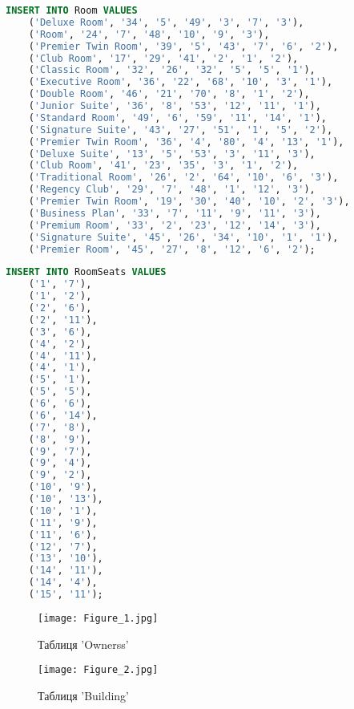\documentclass[a4paper,12pt]{article}
\begin{document}
	
	\begin{lstlisting}[language=SQL]
	INSERT INTO Room VALUES
	('Deluxe Room', '34', '5', '49', '3', '7', '3'),
	('Room', '24', '7', '48', '10', '9', '3'),
	('Premier Twin Room', '39', '5', '43', '7', '6', '2'),
	('Club Room', '17', '29', '41', '2', '1', '2'),
	('Classic Room', '32', '26', '32', '5', '5', '1'),
	('Executive Room', '36', '22', '68', '10', '3', '1'),
	('Double Room', '46', '21', '70', '8', '1', '2'),
	('Junior Suite', '36', '8', '53', '12', '11', '1'),
	('Standard Room', '49', '6', '59', '11', '14', '1'),
	('Signature Suite', '43', '27', '51', '1', '5', '2'),
	('Premier Twin Room', '36', '4', '80', '4', '13', '1'),
	('Deluxe Suite', '13', '5', '53', '3', '11', '3'),
	('Club Room', '41', '23', '35', '3', '1', '2'),
	('Traditional Room', '26', '2', '64', '10', '6', '3'),
	('Regency Club', '29', '7', '48', '1', '12', '3'),
	('Premier Twin Room', '19', '30', '40', '10', '2', '3'),
	('Business Plan', '33', '7', '11', '9', '11', '3'),
	('Premium Room', '33', '2', '23', '12', '14', '3'),
	('Signature Suite', '45', '26', '34', '10', '1', '1'),
	('Premier Room', '45', '27', '8', '12', '6', '2');
	\end{lstlisting}
	
	\begin{lstlisting}[language=SQL]
	INSERT INTO RoomSeats VALUES
	('1', '7'), 
	('1', '2'),
	('2', '6'), 
	('2', '11'),
	('3', '6'),
	('4', '2'), 
	('4', '11'), 
	('4', '1'),
	('5', '1'), 
	('5', '5'),
	('6', '6'), 
	('6', '14'), 
	('7', '8'),
	('8', '9'),
	('9', '7'), 
	('9', '4'), 
	('9', '2'),
	('10', '9'), 
	('10', '13'), 
	('10', '1'),
	('11', '9'), 
	('11', '6'), 
	('12', '7'),
	('13', '10'),
	('14', '11'), 
	('14', '4'),
	('15', '11');
	\end{lstlisting}
	
	\begin{figure}[h!]
		\centering
		\begin{minipage}[h]{1\linewidth}
			\texttt{[image: Figure\_1.jpg]}  
		\end{minipage}
		\caption{Таблиця 'Ownerss'}
	\end{figure}

	\begin{figure}[h!]
		\centering
		\begin{minipage}[h]{1\linewidth}
			\texttt{[image: Figure\_2.jpg]}  
		\end{minipage}
		\caption{Таблиця 'Building'}
	\end{figure}
	
\end{document}

